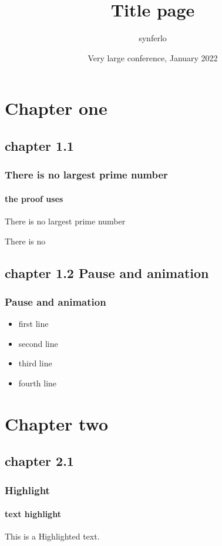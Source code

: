 \documentclass[12pt]{beamer}
\title[My beamer]{Title page}
\author[]{synferlo}
\date[VLC 2022]{Very large conference, January 2022}
\begin{document}
\frame{\titlepage}




\section{Chapter one}
\subsection{chapter 1.1}

\begin{frame}
		\frametitle{There is no largest prime number}
		\framesubtitle{the proof uses}
		There is no largest prime number

		\begin{theorem}
				There is no
		\end{theorem}

\end{frame}




\subsection{chapter 1.2 Pause and animation}
\begin{frame}
\frametitle{Pause and animation}
\begin{itemize}
\item first line \pause\\
\item second line \pause\\
\item third line \pause\\
\item fourth line \pause\\
\end{itemize}

\end{frame}






\section{Chapter two}
\subsection{chapter 2.1}
\begin{frame}
\frametitle{Highlight}
\framesubtitle{text highlight}
This is a \alert{Highlighted} text.

\end{frame}
\end{document}
